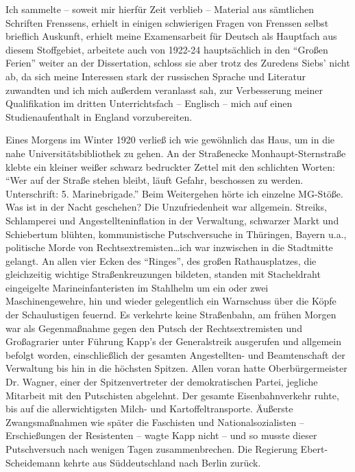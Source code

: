 \documentclass[a5paper,pagesize,10pt,twoside=true]{scrbook}
\begin{document}
Ich sammelte -- soweit mir hierfür Zeit verblieb -- Material aus sämtlichen Schriften Frenssens, erhielt in einigen schwierigen Fragen von Frenssen selbst brieflich Auskunft, erhielt meine Examensarbeit für Deutsch als Hauptfach aus diesem Stoffgebiet, arbeitete auch von 1922-24 hauptsächlich in den \enquote{Großen Ferien} weiter an der Dissertation, schloss sie aber trotz des Zuredens Siebs' nicht ab, da sich meine Interessen stark der russischen Sprache und Literatur zuwandten und ich mich außerdem veranlasst sah, zur Verbesserung meiner Qualifikation im dritten Unterrichtsfach -- Englisch -- mich auf einen Studienaufenthalt in England vorzubereiten.

Eines Morgens im Winter 1920 verließ ich wie gewöhnlich das Haus, um in die nahe Universitätsbibliothek zu gehen. An der Straßenecke Monhaupt-Sternstraße klebte ein kleiner weißer schwarz bedruckter Zettel mit den schlichten Worten: \enquote{Wer auf der Straße stehen bleibt, läuft Gefahr, beschossen zu werden. Unterschrift: 5. Marinebrigade.} Beim Weitergehen hörte ich einzelne MG-Stöße. Was ist in der Nacht geschehen? Die Unzufriedenheit war allgemein. Streiks, Schlamperei und Angestellteninflation in der Verwaltung, schwarzer Markt und Schiebertum blühten, kommunistische Putschversuche in Thüringen, Bayern u.a., politische Morde von Rechtsextremisten\dots ich war inzwischen in die Stadtmitte gelangt. An allen vier Ecken des \enquote{Ringes}, des großen Rathausplatzes, die gleichzeitig wichtige Straßenkreuzungen bildeten, standen mit Stacheldraht eingeigelte Marineinfanteristen im Stahlhelm um ein oder zwei Maschinengewehre, hin und wieder gelegentlich ein Warnschuss über die Köpfe der Schaulustigen feuernd. Es verkehrte keine Straßenbahn, am frühen Morgen war als Gegenmaßnahme gegen den Putsch der Rechtsextremisten und Großagrarier unter Führung Kapp's der Generalstreik ausgerufen und allgemein befolgt worden, einschließlich der gesamten Angestellten- und Beamtenschaft der Verwaltung bis hin in die höchsten Spitzen. Allen voran hatte Oberbürgermeister Dr. Wagner, einer der Spitzenvertreter der demokratischen Partei, jegliche Mitarbeit mit den Putschisten abgelehnt. Der gesamte Eisenbahnverkehr ruhte, bis auf die allerwichtigsten Milch- und Kartoffeltransporte. Äußerste Zwangsmaßnahmen wie später die Faschisten und Nationalsozialisten -- Erschießungen der Resistenten -- wagte Kapp nicht -- und so musste dieser Putschversuch nach wenigen Tagen zusammenbrechen. Die Regierung Ebert-Scheidemann kehrte aus Süddeutschland nach Berlin zurück.
\end{document}
